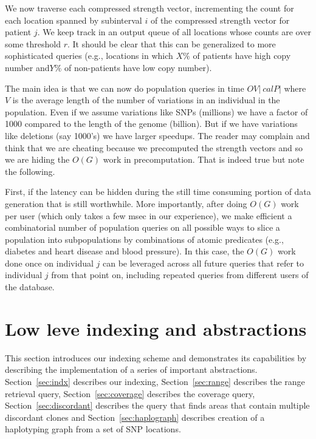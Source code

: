 \documentclass[10pt,fullpage]{article}
\newcommand{\secref}[1]{\mbox{Section~\ref{#1}}}
\begin{document}
We now traverse each compressed strength vector, incrementing the
count for each location spanned by subinterval $i$ of the
compressed strength vector for patient $j$.  We keep track
in an output queue of all locations whose counts are over some
threshold  $r$.  It should be clear that this can be generalized
to more sophisticated queries (e.g., locations in which
$X\%$ of patients have high copy number and$Y\%$ of non-patients
have low copy number).

The main idea is that we can now do population queries in time
$O V |{\ cal P}|$ where $V$ is the average length of the
number of variations in an individual in the population.  
Even if we assume variations like SNPs (millions) we have
a factor of 1000 compared to the length of the genome (billion).
But if we have variations like deletions (say 1000's) we
have larger speedups.  The reader may complain and think
that we are cheating because we precomputed the strength vectors
and so we are hiding the $O(G)$ work in precomputation.
That is indeed true but note the following.

First, if the latency can be
hidden during the still time consuming portion of data
generation that is still worthwhile.  More importantly,
after doing $O(G)$ work per user (which only takes a few msec
in our experience), we make efficient a combinatorial number of
population queries on all possible ways to slice a population
into subpopulations by combinations of atomic predicates
(e.g., diabetes and heart disease and blood pressure).  
In this case, the $O(G)$ work done once on individual $j$
can be leveraged
across all future queries that refer to individual $j$ from that
point on, including repeated queries from different users
of the database.



\section{Low leve indexing and abstractions}
This section introduces our indexing scheme and demonstrates its
capabilities by describing the implementation of a series of important
abstractions. \secref{sec:indx} describes our indexing,
\secref{sec:range} describes the range retrieval query,
\secref{sec:coverage} describes the coverage query,
\secref{sec:discordant} describes the query that finds areas that
contain multiple discordant clones and \secref{sec:haplograph}
describes creation of a haplotyping graph from a set of SNP locations.
\end{document}
